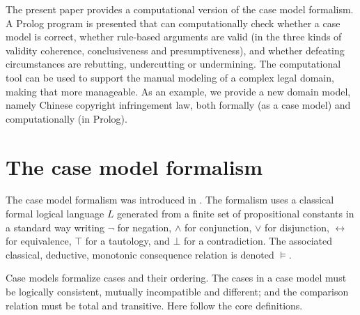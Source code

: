 \documentclass{IOS-Book-Article}
\begin{document}

The present paper provides a computational version of the case model formalism. A Prolog program is presented that can computationally check whether a case model is correct, whether rule-based arguments are valid (in the three kinds of validity coherence, conclusiveness and presumptiveness), and whether defeating circumstances are rebutting, undercutting or undermining. The computational tool can be used to support the manual modeling of a complex legal domain, making that more manageable. As an example, we provide a new domain model, namely Chinese copyright infringement law, both formally (as a case model) and computationally (in Prolog).

\section{The case model formalism}

\noindent The case model formalism was introduced in \citep{Verheij2016Correct}. The formalism uses a classical formal logical  language $L$ generated from a finite set of propositional constants in a standard way writing $\neg$ for negation, $\wedge$ for conjunction, $\vee$ for disjunction, $\leftrightarrow$ for equivalence, $\top$ for a tautology, and $\bot$ for a contradiction. The associated classical, deductive, monotonic consequence relation is denoted $\vDash$.  

Case models formalize cases and their ordering. The cases in a case model must be logically consistent, mutually incompatible and different; and the comparison relation must be total and transitive. Here follow the core definitions.
\end{document}
